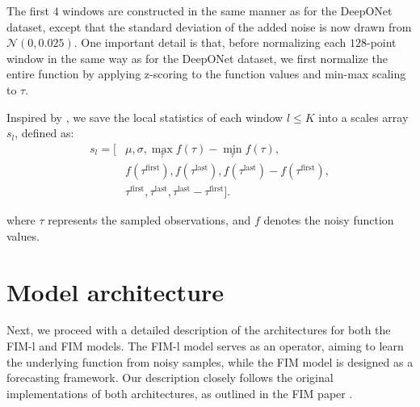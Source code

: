\documentclass{article}
\theoremstyle{plain}
\theoremstyle{definition}
\theoremstyle{remark}
\begin{document}
The first \(4\) windows are constructed in the same manner as for the DeepONet dataset, except that the standard deviation of the added noise is now drawn from \(\mathcal{N}(0, 0.025)\). One important detail is that, before normalizing each \(128\)-point window in the same way as for the DeepONet dataset, we first normalize the entire function by applying z-scoring to the function values and min-max scaling to \(\tau\).

Inspired by \cite{fim-l}, we save the local statistics of each window $l\leq K$ into a scales array \(s_l\), defined as:
\[
\begin{aligned}
s_l = [&\mu, \sigma, \max_{\tau} f(\tau) - \min_{\tau} f(\tau), \\
       &f(\tau^{\text{first}}), f(\tau^{\text{last}}), 
        f(\tau^{\text{last}}) - f(\tau^{\text{first}}), \\
       &\tau^{\text{first}}, \tau^{\text{last}}, 
        \tau^{\text{last}} - \tau^{\text{first}}].
\end{aligned}
\]


where \(\tau\) represents the sampled observations, and \(f\) denotes the noisy function values.



\section{Model architecture}
Next, we proceed with a detailed description of the architectures for both the FIM-l and FIM models. The FIM-l model serves as an operator, aiming to learn the underlying function from noisy samples, while the FIM model is designed as a forecasting framework. Our description closely follows the original implementations of both architectures, as outlined in the FIM paper \cite{fim-l}.
\end{document}
